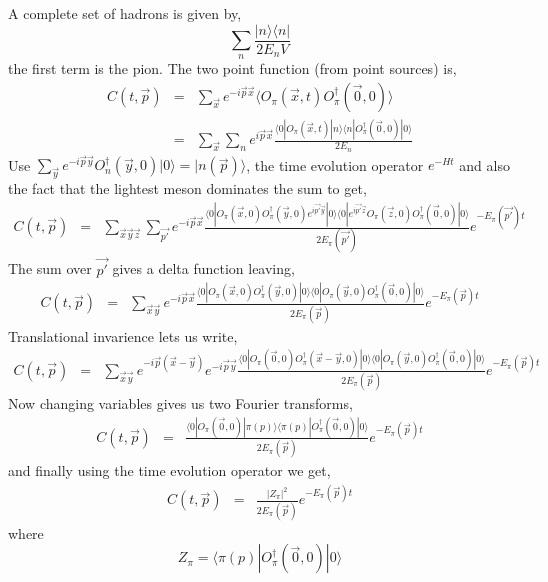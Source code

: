 \documentclass[3p,preprint]{elsarticle}
\begin{document}
A complete set of hadrons is given by,
\begin{equation}
	\sum_n \frac{ | n \rangle \langle n |}{ 2 E_n V}
\end{equation}
the first term is the pion. The two point function (from point sources) is,
\begin{eqnarray}
C(t, \vec{p}) &=& \sum_{\vec{x}} e^{-i \vec{p} \vec{x}} \langle O_\pi (\vec{x}, t) O^\dagger_\pi (\vec{0}, 0)\rangle \\
&=& \sum_{\vec{x}} \sum_n e^{i \vec{p} \vec{x}}  
\frac{ \langle 0 | O_\pi (\vec{x}, t)  | n \rangle \langle n | O^\dagger_\pi (\vec{0}, 0)| 0 \rangle }{ 2 E_n } 
\end{eqnarray}
Use $\sum_{ \vec{y} } e^{-i\vec{p} \vec{y}} O^\dagger_n (\vec{y}, 0) | 0 \rangle  = | n(\vec{p}) \rangle$, the time evolution
operator $e^{-Ht}$ and
also the fact that the lightest meson dominates the sum to get,
\begin{eqnarray}
C(t, \vec{p}) 
&=& \sum_{\vec{x} \vec{y} \vec{z}} \sum_{\vec{p'} } e^{-i \vec{p} \vec{x}}  
\frac{ \langle 0 | O_\pi (\vec{x}, 0)  O^\dagger_\pi (\vec{y}, 0) e^{i \vec{p'} \vec{y} }   | 0 \rangle \langle 0 | e^{i \vec{p'} \vec{z} } O_\pi (\vec{z}, 0) O^\dagger_\pi (\vec{0}, 0)| 0 \rangle }{ 2 E_\pi(\vec{p'}) } e^{- E_\pi(\vec{p'}) t }
\end{eqnarray}
The sum over $\vec{p'}$ gives a delta function leaving,
\begin{eqnarray}
C(t, \vec{p}) 
&=& \sum_{\vec{x} \vec{y} } e^{-i \vec{p} \vec{x}}  
\frac{ \langle 0 | O_\pi (\vec{x}, 0)  O^\dagger_\pi (\vec{y}, 0) | 0 \rangle \langle 0 | O_\pi (\vec{y}, 0) O^\dagger_\pi (\vec{0}, 0) | 0 \rangle }{ 2 E_\pi(\vec{p}) } e^{- E_\pi(\vec{p}) t }
\end{eqnarray}
Translational invarience lets us write,
\begin{eqnarray}
C(t, \vec{p}) 
&=& \sum_{\vec{x} \vec{y} } e^{-i \vec{p} ( \vec{x} - \vec{y} ) } e^{ -i \vec{p} \vec{y} }  
\frac{ \langle 0 | O_\pi (\vec{0}, 0)  O^\dagger_\pi (\vec{x}-\vec{y}, 0) | 0 \rangle \langle 0 | O_\pi (\vec{y}, 0) O^\dagger_\pi (\vec{0}, 0)| 0 \rangle }{ 2 E_\pi(\vec{p}) } e^{- E_\pi(\vec{p}) t }
\end{eqnarray}
Now changing variables gives us two Fourier transforms,
\begin{eqnarray}
C(t, \vec{p}) 
&=&  
\frac{ \langle 0 |  O_\pi (\vec{0}, 0) | \pi(p) \rangle \langle \pi(p) | O^\dagger_\pi (\vec{0}, 0)| 0 \rangle }{ 2 E_\pi(\vec{p}) } e^{- E_\pi(\vec{p}) t }
\end{eqnarray}
and finally using the time evolution operator we get,
\begin{eqnarray}
C(t, \vec{p}) 
&=&  
\frac{ |Z_\pi|^2 }{ 2 E_\pi(\vec{p}) } e^{- E_\pi(\vec{p}) t }
\end{eqnarray}
where 
\begin{equation}
Z_\pi = \langle \pi(p) | O^\dagger_\pi (\vec{0}, 0)| 0 \rangle
\end{equation}
\end{document}
